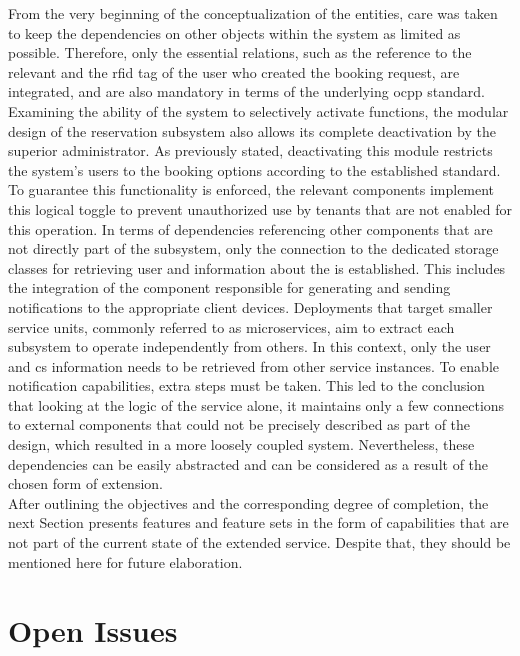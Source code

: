 From the very beginning of the conceptualization of the entities, care was taken to keep the dependencies on other objects within the system as limited as possible. Therefore, only the essential relations, such as the reference to the relevant  and the \acrshort{rfid} tag of the user who created the booking request, are integrated, and are also mandatory in terms of the underlying \acrshort{ocpp} standard.
Examining the ability of the system to selectively activate functions, the modular design of the reservation subsystem also allows its complete deactivation by the superior administrator. As previously stated, deactivating this module restricts the system's users to the booking options according to the established standard.
To guarantee this functionality is enforced, the relevant components implement this logical toggle to prevent unauthorized use by tenants that are not enabled for this operation.
In terms of dependencies referencing other components that are not directly part of the subsystem, only the connection to the dedicated storage classes for retrieving user and information about the  is established. This includes the integration of the component responsible for generating and sending notifications to the appropriate client devices.
Deployments that target smaller service units, commonly referred to as microservices, aim to extract each subsystem to operate independently from others. In this context, only the user and \acrshort{cs} information needs to be retrieved from other service instances. To enable notification capabilities, extra steps must be taken. 
This led to the conclusion that looking at the logic of the service alone, it maintains only a few connections to external components that could not be precisely described as part of the design, which resulted in a more loosely coupled system. Nevertheless, these dependencies can be easily abstracted and can be considered as a result of the chosen form of extension. \\

\noindent After outlining the objectives and the corresponding degree of completion, the next Section presents features and feature sets in the form of capabilities that are not part of the current state of the extended service. Despite that, they should be mentioned here for future elaboration.

\section{Open Issues}
\label{ch:Analysis and Validation:sec:Open Issues}


